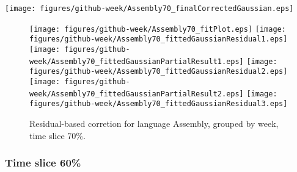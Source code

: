 \begin{center}
{\texttt{[image: figures/github-week/Assembly70\_finalCorrectedGaussian.eps]}}
\end{center}

\FloatBarrier

\begin{figure}[t]
\centering
{}
{\texttt{[image: figures/github-week/Assembly70\_fitPlot.eps]}}
{\texttt{[image: figures/github-week/Assembly70\_fittedGaussianResidual1.eps]}}
{\texttt{[image: figures/github-week/Assembly70\_fittedGaussianPartialResult1.eps]}}
{\texttt{[image: figures/github-week/Assembly70\_fittedGaussianResidual2.eps]}}
{\texttt{[image: figures/github-week/Assembly70\_fittedGaussianPartialResult2.eps]}}
{\texttt{[image: figures/github-week/Assembly70\_fittedGaussianResidual3.eps]}}
\caption{Residual-based corretion for language Assembly, grouped by week, time slice 70\%.}
\end{figure}


\FloatBarrier


\subsubsection{Time slice 60\%}

